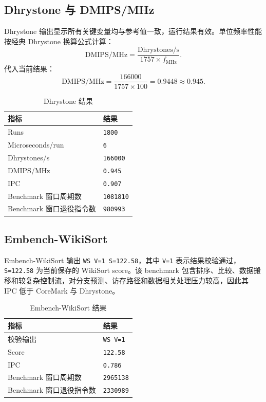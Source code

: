 ﻿\documentclass[UTF8,a4paper,12pt]{ctexart}
\begin{document}
\subsection{Dhrystone 与 DMIPS/MHz}

Dhrystone 输出显示所有关键变量均与参考值一致，运行结果有效。单位频率性能按经典 Dhrystone 换算公式计算：
\[
    \mathrm{DMIPS/MHz}=\frac{\mathrm{Dhrystones/s}}{1757\times f_{\mathrm{MHz}}}.
\]
代入当前结果：
\[
    \mathrm{DMIPS/MHz}=\frac{166000}{1757\times100}=0.9448\approx0.945.
\]

\begin{table}[htbp]
    \centering
    \caption{Dhrystone 结果}
    \begin{tabularx}{0.62\textwidth}{YY}
        \toprule
        指标 & 结果 \\
        \midrule
        Runs & \texttt{1800} \\
        Microseconds/run & \texttt{6} \\
        Dhrystones/s & \texttt{166000} \\
        DMIPS/MHz & \texttt{0.945} \\
        IPC & \texttt{0.907} \\
        Benchmark 窗口周期数 & \texttt{1081810} \\
        Benchmark 窗口退役指令数 & \texttt{980993} \\
        \bottomrule
    \end{tabularx}
\end{table}

\subsection{Embench-WikiSort}

Embench-WikiSort 输出 \texttt{WS V=1 S=122.58}，其中 \texttt{V=1} 表示结果校验通过，\texttt{S=122.58} 为当前保存的 WikiSort score。该 benchmark 包含排序、比较、数据搬移和较复杂控制流，对分支预测、访存路径和数据相关处理压力较高，因此其 IPC 低于 CoreMark 与 Dhrystone。

\begin{table}[htbp]
    \centering
    \caption{Embench-WikiSort 结果}
    \begin{tabularx}{0.62\textwidth}{YY}
        \toprule
        指标 & 结果 \\
        \midrule
        校验输出 & \texttt{WS V=1} \\
        Score & \texttt{122.58} \\
        IPC & \texttt{0.786} \\
        Benchmark 窗口周期数 & \texttt{2965138} \\
        Benchmark 窗口退役指令数 & \texttt{2330989} \\
        \bottomrule
    \end{tabularx}
\end{table}
\end{document}
